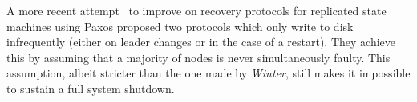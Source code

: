 A more recent attempt~\cite{recovery-paxos} to improve on recovery protocols for
replicated state machines using Paxos proposed two protocols
which only write to disk infrequently (either on leader changes
or in the case of a restart). They achieve this by assuming that
a majority of nodes is never simultaneously faulty. This
assumption, albeit stricter than the one made by \emph{Winter},
still makes it impossible to sustain a full system
shutdown.
